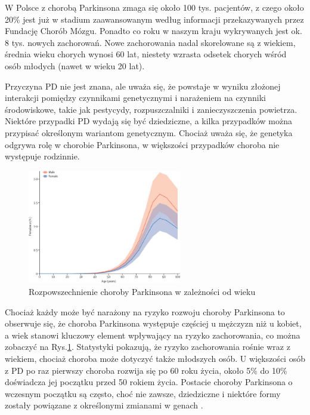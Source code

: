 W Polsce z chorobą Parkinsona zmaga się około 100 tys. pacjentów, z czego około 20\% jest już w stadium zaawansowanym
według informacji przekazywanych przez Fundację Chorób Mózgu.
Ponadto co roku w naszym kraju wykrywanych jest ok. 8 tys. nowych zachorowań.
Nowe zachorowania nadal skorelowane są z wiekiem, średnia wieku chorych wynosi 60 lat, niestety wzrasta odsetek chorych wśród osób młodych (nawet w wieku 20 lat).

Przyczyna PD nie jest znana, ale uważa się, że powstaje w wyniku złożonej interakcji pomiędzy czynnikami genetycznymi i
narażeniem na czynniki środowiskowe, takie jak pestycydy, rozpuszczalniki i zanieczyszczenia powietrza.
Niektóre przypadki PD wydają się być dziedziczne, a kilka przypadków można przypisać określonym wariantom genetycznym.
Chociaż uważa się, że genetyka odgrywa rolę w chorobie Parkinsona, w większości przypadków choroba nie występuje rodzinnie\cite{National_Institute_on_Aging_2022}.

\begin{figure}[htbp]
	\centering
	\includegraphics[width=0.6\textwidth]{./img/PD_prevalence}
	\caption{Rozpowszechnienie choroby Parkinsona w zależności od wieku \cite{global_PD}}
    \label{fig:PD_prevalance}
\end{figure}

Chociaż każdy może być narażony na ryzyko rozwoju choroby Parkinsona to obserwuje się, że choroba Parkinsona występuje częściej u mężczyzn niż u kobiet,
a wiek stanowi kluczowy element wpływający na ryzyko zachorowania, co można zobaczyć na Rys.\ref{fig:PD_prevalance}.
Statystyki pokazują, że ryzyko zachorowania rośnie wraz z wiekiem, chociaż choroba może dotyczyć także młodszych osób.
U większości osób z PD po raz pierwszy choroba rozwija się po 60 roku życia, około 5\% do 10\% doświadcza jej początku przed 50 rokiem życia.
Postacie choroby Parkinsona o wczesnym początku są często, choć nie zawsze, dziedziczne i niektóre formy zostały powiązane z
określonymi zmianami w genach \cite{National_Institute_on_Aging_2022}.

